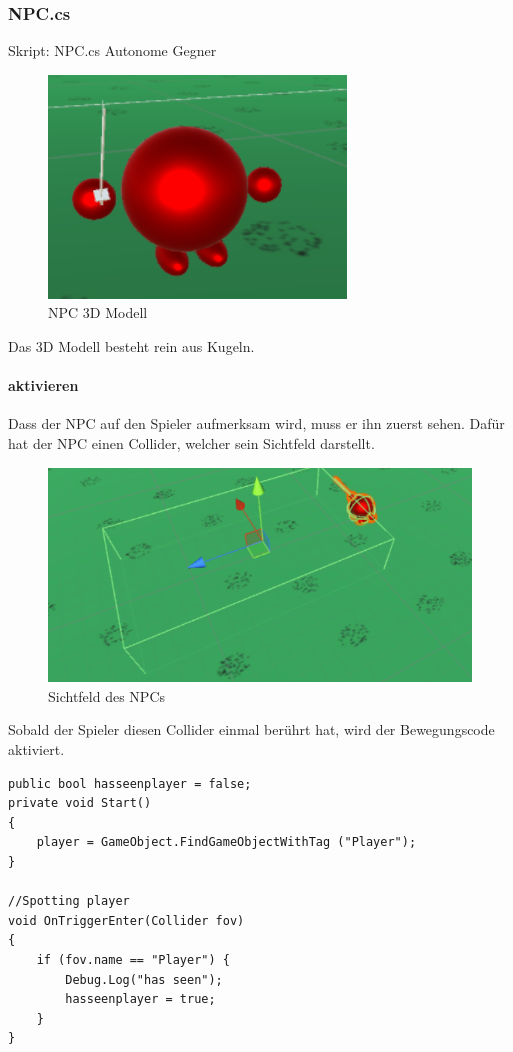 \subsubsection{NPC.cs}
\label{subsubsec:npc}
Skript: NPC.cs
Autonome Gegner
\begin{figure}[H]
\includegraphics[scale=1]{screenshots/npc.png}
\caption{NPC 3D Modell}
\end{figure}
Das 3D Modell besteht rein aus Kugeln.

\paragraph{aktivieren}
Dass der NPC auf den Spieler aufmerksam wird, muss er ihn zuerst sehen.
Dafür hat der NPC einen Collider, welcher sein Sichtfeld darstellt.
\begin{figure}[H]
\includegraphics[scale=1]{screenshots/fov.png}
\caption{Sichtfeld des NPCs}
\end{figure}
Sobald der Spieler diesen Collider einmal berührt hat, wird der Bewegungscode aktiviert.
\begin{lstlisting}
public bool hasseenplayer = false;
private void Start()
{
	player = GameObject.FindGameObjectWithTag ("Player");
}
	
//Spotting player
void OnTriggerEnter(Collider fov)
{	
	if (fov.name == "Player") {
		Debug.Log("has seen");
		hasseenplayer = true;
	}
}
\end{lstlisting}
